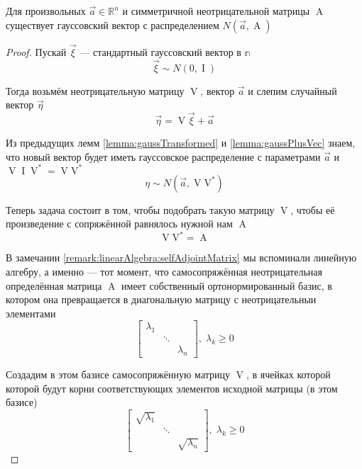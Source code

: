 \begin{theorem}\label{theorem:gaussianVectorExistance}
    Для произвольных $\vec{a} \in \mathbb{R}^n$ и симметричной неотрицательной
    матрицы $\operatorname{A}$ существует гауссовский вектор с распределением
    $N\left( \vec{a}, \operatorname{A} \right)$
\end{theorem}
\begin{proof}
    Пускай $\vec{\xi}$ --- стандартный гауссовский вектор в $\mathbb{n}$
    $$\vec{\xi} \sim N\left( 0, \operatorname{I} \right)$$

    Тогда возьмём неотрицательную матрицу $\operatorname{V}$, вектор $\vec{a}$ и
    слепим случайный вектор $\vec{\eta}$
    $$\vec{\eta} = \operatorname{V} \vec{\xi} + \vec{a}$$

    Из предыдущих лемм \ref{lemma:gaussTransformed} и \ref{lemma:gaussPlusVec}
    знаем, что новый вектор будет иметь гауссовское распределение с параметрами
    $\vec{a}$ и $\operatorname{V} \operatorname{I} \operatorname{V}^* 
    = \operatorname{V} \operatorname{V^*} $
    $$\eta \sim N\left( \vec{a}, \operatorname{V} \operatorname{V^*} \right)$$

    Теперь задача состоит в том, чтобы подобрать такую матрицу $\operatorname{V}$,
    чтобы её произведение с сопряжённой равнялось нужной нам $\operatorname{A}$
    $$\operatorname{V} \operatorname{V^*} = \operatorname{A}$$

    В замечании \ref{remark:linearAlgebra:selfAdjointMatrix} мы вспоминали
    линейную алгебру, а именно --- тот момент, что самосопряжённая
    неотрицательная определённая матрица $\operatorname{A}$ имеет собственный
    ортонормированный базис, в котором она превращается в диагональную матрицу
    с неотрицательныи элементами
    $$
    \begin{bmatrix}
        \lambda_1 & & \\
        & \ddots &  \\
        & & \lambda_n
    \end{bmatrix},\;
        \lambda_k \ge 0$$

    Создадим в этом базисе самосопряжённую матрицу $\operatorname{V}$, в ячейках
    которой которой будут корни соответствующих элементов исходной матрицы
    (в этом базисе)
    $$
    \begin{bmatrix}
        \sqrt{\lambda_1} & & \\
        & \ddots &  \\
        & & \sqrt{\lambda_n}
    \end{bmatrix},\; \lambda_k \ge 0$$


\end{proof}
